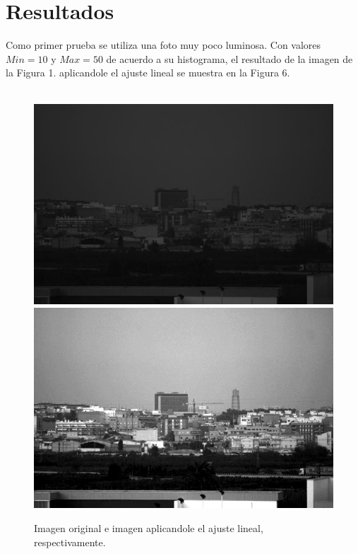 \documentclass[conference]{IEEEtran}
\begin{document}
\section{Resultados}
Como primer prueba se utiliza una foto muy poco luminosa. Con valores $Min=10$ y $Max=50$ de acuerdo a su histograma, el resultado de la imagen de la Figura 1. aplicandole el ajuste lineal se muestra en la Figura 6.\\\\
\begin{figure}[h]
	\begin{center}
		\setlength{\unitlength}{0.00105in}
		\includegraphics[scale=0.23]{./images/city.jpg}
		\includegraphics[scale=0.2298]{./images/city_out.png}
	\end{center}
	\caption{Imagen original e imagen aplicandole el ajuste lineal, respectivamente.}
\end{figure}
\end{document}
